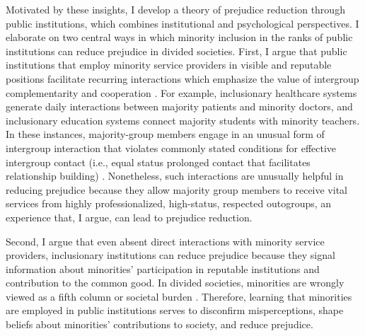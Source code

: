 \documentclass[12pt]{article}
\theoremstyle{plain}
\begin{document}
Motivated by these insights, I develop a theory of prejudice reduction through public institutions, which combines institutional and psychological perspectives. I elaborate on two central ways in which minority inclusion in the ranks of public institutions can reduce prejudice in divided societies. First, I argue that public institutions that employ minority service providers in visible and reputable positions facilitate recurring interactions which emphasize the value of intergroup complementarity and cooperation \citep{Jha:2013aa,Jha:2022wp}. For example, inclusionary healthcare systems generate daily interactions between majority patients and minority doctors, and inclusionary education systems connect majority students with minority teachers. In these instances, majority-group members engage in an unusual form of intergroup interaction that violates commonly stated conditions for effective intergroup contact (i.e., equal status prolonged contact that facilitates relationship building) \citep{Allport1954}. Nonetheless, such interactions are unusually helpful in reducing prejudice because they allow majority group members to receive vital services from highly professionalized, high-status, respected outogroups, an experience that, I argue, can lead to prejudice reduction. 


Second, I argue that even absent direct interactions with minority service providers, inclusionary institutions can reduce prejudice because they signal information about minorities' participation in reputable institutions and contribution to the common good. In divided societies, minorities are wrongly viewed as a fifth column or societal burden \citep{Bracic:2020ud,Lajevardi:2020aa}. Therefore, learning that minorities are employed in public institutions serves to disconfirm misperceptions, shape beliefs about minorities' contributions to society, and reduce prejudice.
\end{document}
